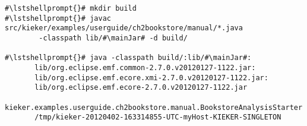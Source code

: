 \begin{lstlisting}[caption=Commands to compile and run the analysis under \UnixLikeSystems{},label=lst:bookstoreAnalysisStarterLinux] 			
#\lstshellprompt{}# mkdir build
#\lstshellprompt{}# javac src/kieker/examples/userguide/ch2bookstore/manual/*.java 
        -classpath lib/#\mainJar# -d build/

#\lstshellprompt{}# java -classpath build/:lib/#\mainJar#:
       lib/org.eclipse.emf.common-2.7.0.v20120127-1122.jar:
       lib/org.eclipse.emf.ecore.xmi-2.7.0.v20120127-1122.jar:
       lib/org.eclipse.emf.ecore-2.7.0.v20120127-1122.jar
       kieker.examples.userguide.ch2bookstore.manual.BookstoreAnalysisStarter 
       /tmp/kieker-20120402-163314855-UTC-myHost-KIEKER-SINGLETON
\end{lstlisting}	